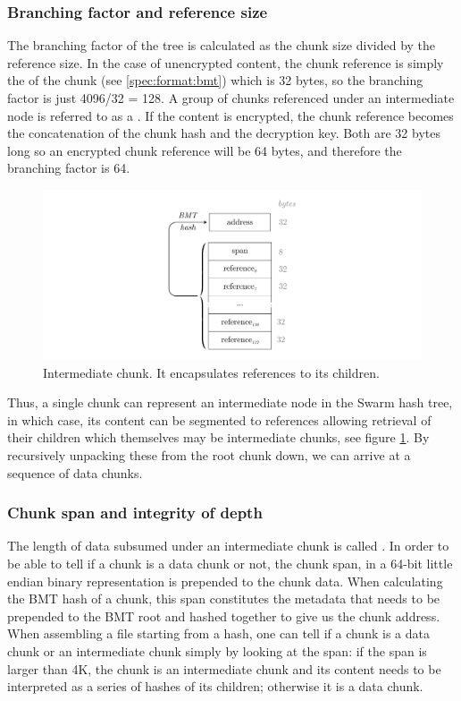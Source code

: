 \subsubsection{Branching factor and reference size}

The branching factor of the tree is calculated as the chunk size divided by the reference size. In the case of unencrypted content, the chunk reference is simply the  of the chunk (see \ref{spec:format:bmt}) which is 32 bytes, so the branching factor is just 4096/32 =  128. A group of chunks referenced under an intermediate node is referred to as a . If the content is encrypted, the chunk reference becomes the concatenation of the chunk hash and the decryption key. Both are 32 bytes long so an encrypted chunk reference will be 64 bytes, and therefore the branching factor is 64. 


\begin{figure}[htbp]
\centering
\includegraphics[width=\textwidth]{fig/intermediate-chunk-3.pdf}
\caption[Intermediate chunk \statusgreen]{Intermediate chunk. It encapsulates references to its children.}
\label{fig:intermediate-chunk}
\end{figure}

Thus, a single chunk can represent an intermediate node in the Swarm hash tree, in which case, its content can be segmented to references allowing retrieval of their children which themselves may be intermediate chunks, see figure \ref{fig:intermediate-chunk}. By recursively unpacking these from the root chunk down, we can arrive at a sequence of data chunks. 

 \subsubsection{Chunk span and integrity of depth}

The length of data subsumed under an intermediate chunk is called . In order to be able to tell if a chunk is a data chunk or not, the chunk span, in a 64-bit little endian binary representation is prepended to the chunk data.  When calculating the BMT hash of a chunk, this span constitutes the metadata that needs to be prepended to the BMT root and hashed together to give us the chunk address. When assembling a file starting from a hash, one can tell if a chunk is a data chunk or an intermediate chunk simply by looking at the span: if the span is larger than 4K, the chunk is an intermediate chunk and its content needs to be interpreted as a series of hashes of its children; otherwise it is a data chunk.


